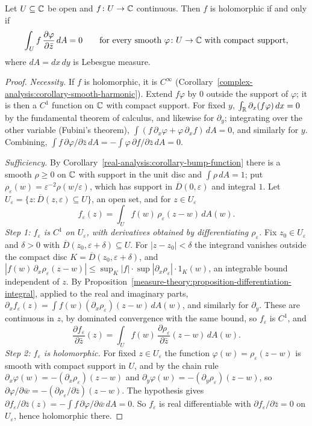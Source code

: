 \begin{proposition}\label{complex-analysis:proposition-weak-cauchy-riemann}
Let $U \subseteq \mathbb{C}$ be open and $f \colon U \to \mathbb{C}$ continuous. Then $f$ is holomorphic if and only if
\[
\int_Uf\,\frac{\partial\varphi}{\partial\bar z}\,dA = 0 \qquad \text{for every smooth } \varphi \colon U \to \mathbb{C} \text{ with compact support,}
\]
where $dA = dx\,dy$ is Lebesgue measure.
\end{proposition}

\begin{proof}
\emph{Necessity.} If $f$ is holomorphic, it is $C^\infty$ (Corollary~\ref{complex-analysis:corollary-smooth-harmonic}). Extend $f\varphi$ by $0$ outside the support of $\varphi$; it is then a $C^1$ function on
$\mathbb{C}$ with compact support. For fixed $y$, $\int_{\mathbb{R}}\partial_x(f\varphi)\,dx = 0$ by the fundamental theorem of calculus, and likewise for $\partial_y$; integrating over the other variable (Fubini's theorem),
$\int(f\,\partial_x\varphi + \varphi\,\partial_xf)\,dA = 0$, and similarly for $y$. Combining, $\int f\,\partial\varphi/\partial\bar z\,dA = -\int\varphi\,\partial f/\partial\bar z\,dA = 0$.

\emph{Sufficiency.} By Corollary~\ref{real-analysis:corollary-bump-function} there is a smooth $\rho \geq 0$ on $\mathbb{C}$ with support in the unit disc and $\int\rho\,dA = 1$; put $\rho_\varepsilon(w) = \varepsilon^{-2}\rho(w/\varepsilon)$,
which has support in $\overline{D}(0, \varepsilon)$ and integral $1$. Let $U_\varepsilon = \{z : \overline{D}(z, \varepsilon) \subseteq U\}$, an open set, and for $z \in U_\varepsilon$
\[
f_\varepsilon(z) = \int_Uf(w)\,\rho_\varepsilon(z - w)\,dA(w).
\]
\emph{Step 1: $f_\varepsilon$ is $C^1$ on $U_\varepsilon$, with derivatives obtained by differentiating $\rho_\varepsilon$.} Fix $z_0 \in U_\varepsilon$ and $\delta > 0$ with $\overline{D}(z_0, \varepsilon + \delta) \subseteq U$.
For $|z - z_0| < \delta$ the integrand vanishes outside the compact disc $K = \overline{D}(z_0, \varepsilon + \delta)$, and $|f(w)\,\partial_x\rho_\varepsilon(z - w)| \leq \sup_K|f| \cdot \sup|\partial_x\rho_\varepsilon| \cdot 1_K(w)$,
an integrable bound independent of $z$. By Proposition~\ref{measure-theory:proposition-differentiation-integral}, applied to the real and imaginary parts, $\partial_xf_\varepsilon(z) = \int f(w)(\partial_x\rho_\varepsilon)(z - w)\,dA(w)$,
and similarly for $\partial_y$. These are continuous in $z$, by dominated convergence with the same bound, so $f_\varepsilon$ is $C^1$, and
\[
\frac{\partial f_\varepsilon}{\partial\bar z}(z) = \int_Uf(w)\,\frac{\partial\rho_\varepsilon}{\partial\bar z}(z - w)\,dA(w).
\]
\emph{Step 2: $f_\varepsilon$ is holomorphic.} For fixed $z \in U_\varepsilon$ the function $\varphi(w) = \rho_\varepsilon(z - w)$ is smooth with compact support in $U$, and by the chain rule
$\partial_x\varphi(w) = -(\partial_x\rho_\varepsilon)(z - w)$ and $\partial_y\varphi(w) = -(\partial_y\rho_\varepsilon)(z - w)$, so $\partial\varphi/\partial\bar w = -(\partial\rho_\varepsilon/\partial\bar z)(z - w)$. The hypothesis gives
$\partial f_\varepsilon/\partial\bar z(z) = -\int f\,\partial\varphi/\partial\bar w\,dA = 0$. So $f_\varepsilon$ is real differentiable with $\partial f_\varepsilon/\partial\bar z = 0$ on $U_\varepsilon$, hence holomorphic there.


\end{proof}
